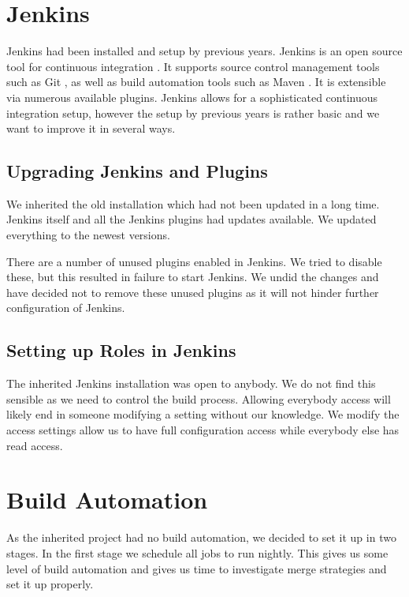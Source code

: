 \section{Jenkins}\label{sec:jenkins}
Jenkins had been installed and setup by previous years. Jenkins is an open source tool for continuous integration \parencite{JenkinsWebsite}. It supports source control management tools such as Git \parencite{gitwebsite}, as well as build automation tools such as Maven \parencite{mavenwebsite}. It is extensible via numerous available plugins. Jenkins allows for a sophisticated continuous integration setup, however the setup by previous years is rather basic and we want to improve it in several ways.

\subsection{Upgrading Jenkins and Plugins}
We inherited the old installation which had not been updated in a long time. Jenkins itself and all the Jenkins plugins had updates available. We updated everything to the newest versions.

There are a number of unused plugins enabled in Jenkins. We tried to disable these, but this resulted in failure to start Jenkins. We undid the changes and have decided not to remove these unused plugins as it will not hinder further configuration of Jenkins.

\subsection{Setting up Roles in Jenkins}
The inherited Jenkins installation was open to anybody. We do not find this sensible as we need to control the build process. Allowing everybody access will likely end in someone modifying a setting without our knowledge. We modify the access settings allow us to have full configuration access while everybody else has read access.

\section{Build Automation}\label{sec:build_automation}
As the inherited project had no build automation, we decided to set it up in two stages. In the first stage we schedule all jobs to run nightly. This gives us some level of build automation and gives us time to investigate merge strategies and set it up properly. 

